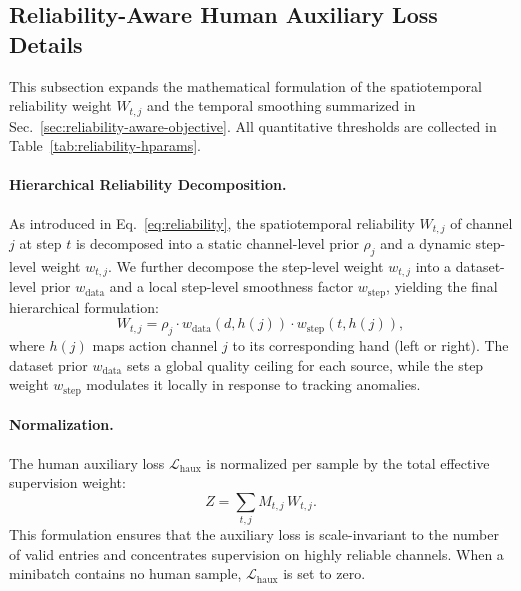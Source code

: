 
\subsection{Reliability-Aware Human Auxiliary Loss Details}
\label{app:reliability-aware-human-details}

This subsection expands the mathematical formulation of the spatiotemporal reliability weight $W_{t,j}$ and the temporal smoothing summarized in Sec.~\ref{sec:reliability-aware-objective}. All quantitative thresholds are collected in Table~\ref{tab:reliability-hparams}.

\paragraph{Hierarchical Reliability Decomposition.}
As introduced in Eq.~\ref{eq:reliability}, the spatiotemporal reliability $W_{t,j}$ of channel $j$ at step $t$ is decomposed into a static channel-level prior $\rho_j$ and a dynamic step-level weight $w_{t,j}$. We further decompose the step-level weight $w_{t,j}$ into a dataset-level prior $w_{\mathrm{data}}$ and a local step-level smoothness factor $w_{\mathrm{step}}$, yielding the final hierarchical formulation:
\begin{equation}
W_{t,j} = \rho_j \cdot w_{\mathrm{data}}(d, h(j)) \cdot w_{\mathrm{step}}(t, h(j)),
\end{equation}
where $h(j)$ maps action channel $j$ to its corresponding hand (left or right). The dataset prior $w_{\mathrm{data}}$ sets a global quality ceiling for each source, while the step weight $w_{\mathrm{step}}$ modulates it locally in response to tracking anomalies.



\paragraph{Normalization.}
The human auxiliary loss $\mathcal{L}_{\mathrm{haux}}$ is normalized per sample by the total effective supervision weight:
\begin{equation}
Z = \sum_{t,j} M_{t,j}\,W_{t,j}.
\end{equation}
This formulation ensures that the auxiliary loss is scale-invariant to the number of valid entries and concentrates supervision on highly reliable channels. When a minibatch contains no human sample, $\mathcal{L}_{\mathrm{haux}}$ is set to zero.


